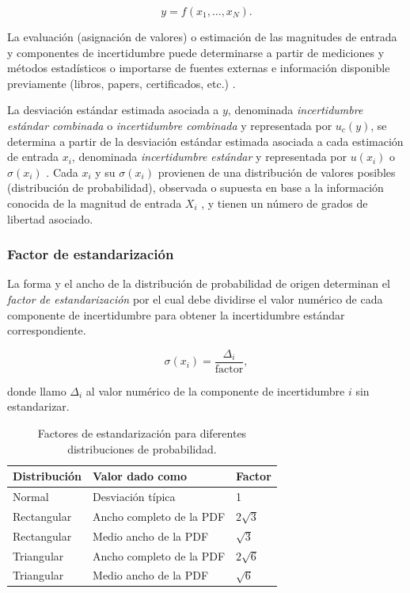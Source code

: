 \begin{equation}
    y = f(x_1, \ldots, x_N).
\end{equation}


La evaluación (asignación de valores) o estimación de las magnitudes de entrada y componentes de incertidumbre puede determinarse a partir de mediciones y métodos estadísticos o importarse de fuentes externas e información disponible previamente (libros, papers, certificados, etc.) \cite{GUM4.1}.

La desviación estándar estimada asociada a $y$, denominada \textit{incertidumbre estándar combinada} o \textit{incertidumbre combinada} y representada por $u_c(y)$, se determina a partir de la desviación estándar estimada asociada a cada estimación de entrada $x_i$, denominada \textit{incertidumbre estándar} y representada por $u(x_i)$ o $\sigma(x_i)$ \cite{GUM4.1}. Cada $x_i$ y su $\sigma(x_i)$ provienen de una distribución de valores posibles (distribución de probabilidad), observada o supuesta en base a la información conocida de la magnitud de entrada $X_i$ \cite{GUM4.1}, y tienen un número de grados de libertad asociado.


\subsubsection{Factor de estandarización}

La forma y el ancho de la distribución de probabilidad de origen determinan el \textit{factor de estandarización} por el cual debe dividirse el valor numérico de cada componente de incertidumbre para obtener la incertidumbre estándar correspondiente.

\begin{equation}
    \sigma(x_i) = \frac{\Delta_i}{\text{factor}},
\end{equation}

donde llamo $\Delta_i$ al valor numérico de la componente de incertidumbre $i$ sin estandarizar.

\begin{table}[!htb]
\centering
\caption{\label{table:t-student}Factores de estandarización para diferentes distribuciones de probabilidad.}

\begin{tabular}{@{}lll@{}}
\toprule
\textbf{Distribución} & \textbf{Valor dado como} & \textbf{Factor} \\ \midrule
Normal       & Desviación típica        & 1         \\
Rectangular  & Ancho completo de la PDF & $2\sqrt{3}$ \\
Rectangular  & Medio ancho de la PDF    & $\sqrt{3}$  \\
Triangular   & Ancho completo de la PDF & $2\sqrt{6}$ \\
Triangular   & Medio ancho de la PDF    & $\sqrt{6}$  \\ \bottomrule
\end{tabular}
\end{table}

